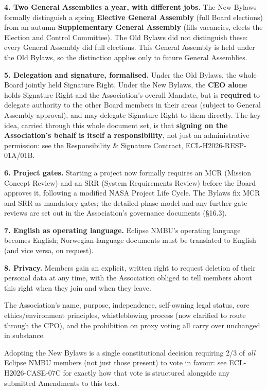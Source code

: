 \documentclass{../../../Common/Latex/Templates/rapport}
\begin{document}
\textbf{4. Two General Assemblies a year, with different jobs.} The New Bylaws formally distinguish a spring \textbf{Elective General Assembly} (full Board elections) from an autumn \textbf{Supplementary General Assembly} (fills vacancies, elects the Election and Control Committee). The Old Bylaws did not distinguish these: every General Assembly did full elections. This General Assembly is held under the Old Bylaws, so the distinction applies only to future General Assemblies.

\textbf{5. Delegation and signature, formalised.} Under the Old Bylaws, the whole Board jointly held Signature Right. Under the New Bylaws, the \textbf{CEO alone} holds Signature Right and the Association's overall Mandate, but is \textbf{required} to delegate authority to the other Board members in their areas (subject to General Assembly approval), and may delegate Signature Right to them directly. The key idea, carried through this whole document set, is that \textbf{signing on the Association's behalf is itself a responsibility}, not just an administrative permission: see the Responsibility \& Signature Contract, ECL-H2026-RESP-01A/01B.

\textbf{6. Project gates.} Starting a project now formally requires an MCR (Mission Concept Review) and an SRR (System Requirements Review) before the Board approves it, following a modified NASA Project Life Cycle. The Bylaws fix MCR and SRR as mandatory gates; the detailed phase model and any further gate reviews are set out in the Association's governance documents (\S16.3).

\textbf{7. English as operating language.} Eclipse NMBU's operating language becomes English; Norwegian-language documents must be translated to English (and vice versa, on request).

\textbf{8. Privacy.} Members gain an explicit, written right to request deletion of their personal data at any time, with the Association obliged to tell members about this right when they join and when they leave.

The Association's name, purpose, independence, self-owning legal status, core ethics/environment principles, whistleblowing process (now clarified to route through the CPO), and the prohibition on proxy voting all carry over unchanged in substance.

Adopting the New Bylaws is a single constitutional decision requiring 2/3 of \emph{all} Eclipse NMBU members (not just those present) to vote in favour: see ECL-H2026-CASE-07C for exactly how that vote is structured alongside any submitted Amendments to this text.
\end{document}
